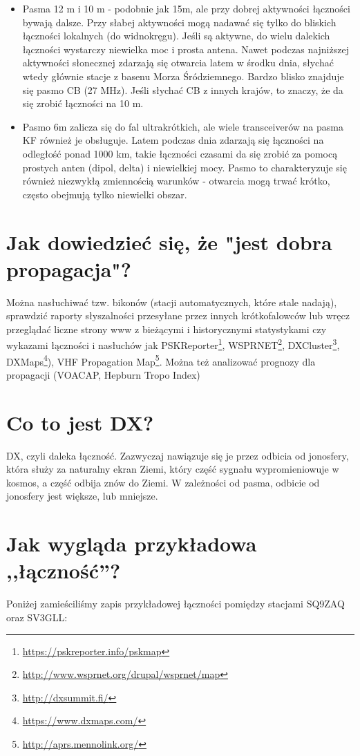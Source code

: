 \documentclass[a4paper,12pt]{article}
\begin{document}
\begin{itemize}
 \item Pasma 12 m i 10 m - podobnie jak 15m, ale przy dobrej aktywności łączności bywają dalsze. Przy słabej aktywności mogą nadawać się tylko do bliskich łączności lokalnych (do widnokręgu). Jeśli są aktywne, do wielu dalekich łączności wystarczy niewielka moc i prosta antena. Nawet podczas najniższej aktywności słonecznej zdarzają się otwarcia latem w środku dnia, słychać wtedy głównie stacje z basenu Morza Śródziemnego. Bardzo blisko znajduje się pasmo CB (27 MHz). Jeśli słychać CB z innych krajów, to znaczy, że da się zrobić łączności na 10 m.
 \item Pasmo 6m zalicza się do fal ultrakrótkich, ale wiele transceiverów na pasma KF również je obsługuje. Latem podczas dnia zdarzają się łączności na odległość ponad 1000 km, takie łączności czasami da się zrobić za pomocą prostych anten (dipol, delta) i niewielkiej mocy. Pasmo to charakteryzuje się również niezwykłą zmiennością warunków - otwarcia mogą trwać krótko, często obejmują tylko niewielki obszar.
\end{itemize}

\section{Jak dowiedzieć się, że "jest dobra propagacja"?}

Można nasłuchiwać tzw. bikonów (stacji automatycznych, które stale nadają), sprawdzić raporty słyszalności przesyłane przez innych krótkofalowców lub wręcz przeglądać liczne strony www z bieżącymi i historycznymi statystykami czy wykazami łączności i nasłuchów jak PSKReporter\footnote{\url{https://pskreporter.info/pskmap}}, WSPRNET\footnote{\url{http://www.wsprnet.org/drupal/wsprnet/map}}, DXCluster\footnote{\url{http://dxsummit.fi/}}, DXMaps\footnote{\url{https://www.dxmaps.com/}}), VHF Propagation Map\footnote{\url{http://aprs.mennolink.org/}}. Można też analizować prognozy dla propagacji (VOACAP, Hepburn Tropo Index)


\section{Co to jest DX?}
DX, czyli daleka łączność. Zazwyczaj nawiązuje się je przez odbicia od jonosfery, która służy za naturalny ekran Ziemi, który część sygnału wypromieniowuje w kosmos, a część odbija znów do Ziemi. W zależności od pasma, odbicie od jonosfery jest większe, lub mniejsze.

\section{Jak wygląda przykładowa ,,łączność''?}
Poniżej zamieściliśmy zapis przykładowej łączności pomiędzy stacjami SQ9ZAQ oraz SV3GLL:
\end{document}
